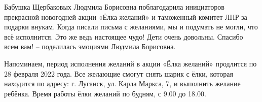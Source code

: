 
Бабушка Щербаковых Людмила Борисовна поблагодарила инициаторов прекрасной
новогодней акции «Ёлка желаний» и таможенный комитет ЛНР за подарки внукам.
Когда писали письма с желаниями, мы и подумать не могли, что всё исполнится.
Это же ведь настоящее чудо! Дети очень довольны. Спасибо всем вам! – поделилась
эмоциями Людмила Борисовна.

Напоминаем, период исполнения желаний в акции «Ёлка желаний» продлится по 28
февраля 2022 года. Все желающие смогут снять шарик с ёлки, которая находится по
адресу: г. Луганск, ул. Карла Маркса, 7, и выполнить желание ребёнка. Время
работы ёлки желаний по будням, с 9.00 до 18.00.
